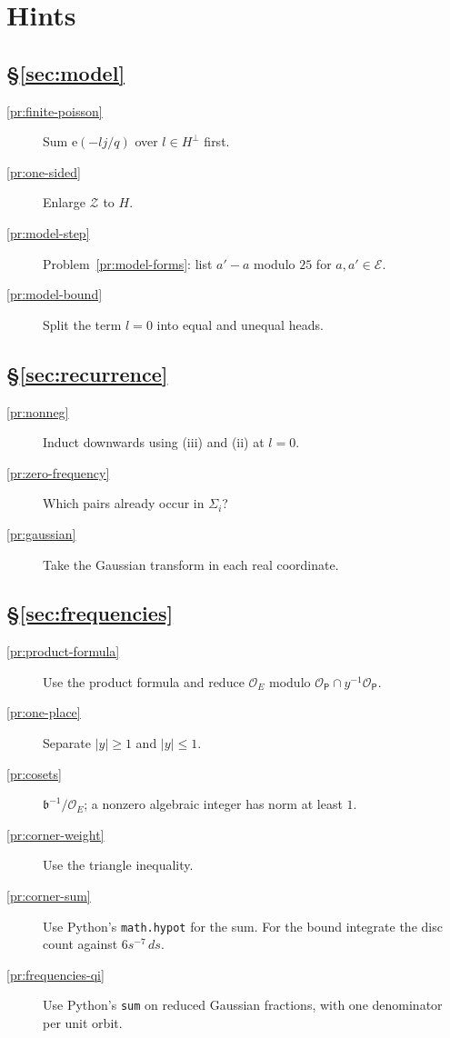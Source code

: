 \documentclass[reqno]{amsart}
\theoremstyle{definition}
\theoremstyle{plain}
\theoremstyle{remark}
\newcommand{\Ec}{\mathcal{E}}
\newcommand{\Zc}{\mathcal{Z}}
\newcommand{\Oc}{\mathcal{O}}
\newcommand{\OP}{\mathcal{O}_{\mathsf P}}
\newcommand{\e}{\mathrm{e}}
\begin{document}
\section*{Hints}

\subsection*{\S\ref{sec:model}}
\begin{description}
\item[\ref{pr:finite-poisson}] Sum \(\e(-lj/q)\) over \(l\in H^\perp\) first.
\item[\ref{pr:one-sided}] Enlarge \(\Zc\) to \(H\).
\item[\ref{pr:model-step}] Problem~\ref{pr:model-forms}: list \(a'-a\) modulo \(25\) for \(a,a'\in\Ec\).
\item[\ref{pr:model-bound}] Split the term \(l=0\) into equal and unequal heads.
\end{description}

\subsection*{\S\ref{sec:recurrence}}
\begin{description}
\item[\ref{pr:nonneg}] Induct downwards using (iii) and (ii) at \(l=0\).
\item[\ref{pr:zero-frequency}] Which pairs already occur in \(\Sigma_i\)?
\item[\ref{pr:gaussian}] Take the Gaussian transform in each real coordinate.
\end{description}

\subsection*{\S\ref{sec:frequencies}}
\begin{description}
\item[\ref{pr:product-formula}] Use the product formula and reduce \(\Oc_E\) modulo \(\OP\cap y^{-1}\OP\).
\item[\ref{pr:one-place}] Separate \(\lvert y\rvert\ge1\) and \(\lvert y\rvert\le1\).
\item[\ref{pr:cosets}] \(\mathfrak b^{-1}/\Oc_E\); a nonzero algebraic integer has norm at least \(1\).
\item[\ref{pr:corner-weight}] Use the triangle inequality.
\item[\ref{pr:corner-sum}] Use Python's \texttt{math.hypot} for the sum.  For the bound integrate the disc count against \(6s^{-7}\,ds\).
\item[\ref{pr:frequencies-qi}] Use Python's \texttt{sum} on reduced Gaussian fractions, with one denominator per unit orbit.
\end{description}
\end{document}
